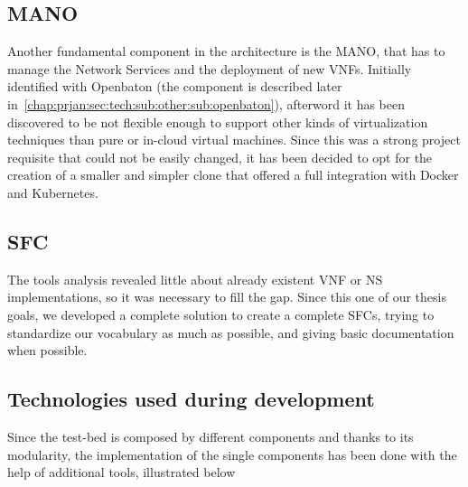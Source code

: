 

\subsection{MANO}

Another fundamental component in the architecture is the MANO, that has to
manage the Network Services and the deployment of new VNFs. Initially identified
with Openbaton (the component is described later
in~\ref{chap:prjan:sec:tech:sub:other:sub:openbaton}), afterword it has been
discovered to be not flexible enough to support other kinds of virtualization
techniques than pure or in-cloud virtual machines. Since this was a strong
project requisite that could not be easily changed, it has been decided to opt
for the creation of a smaller and simpler clone that offered a full integration
with Docker and Kubernetes.

\subsection{SFC}
The tools analysis revealed little about already existent VNF or NS
implementations, so it was necessary to fill the gap. Since this one of our
thesis goals, we developed a complete solution to create a complete SFCs, trying
to standardize our vocabulary as much as possible, and giving basic
documentation when possible.

\subsection{Technologies used during development}

Since the test-bed is composed by different components and thanks to its 
modularity, the implementation of the single components has been done with the 
help of additional tools, illustrated below

